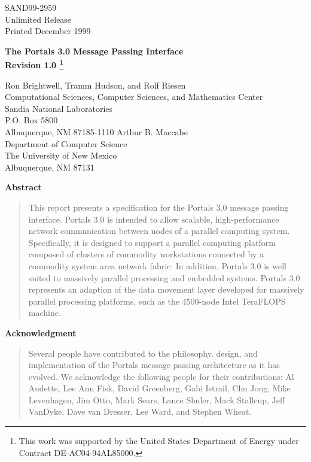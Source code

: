 \documentclass{sand-report}
\begin{document}
\setcounter{page}{3}

\begin{center}
SAND99-2959\\
Unlimited Release\\

\medskip
Printed December 1999

\vskip 1in

\renewcommand{\thefootnote}{\fnsymbol{footnote}}
{\large\bf The Portals 3.0 Message Passing Interface \\ Revision 1.0
\footnote[2]{This work was supported by the United States Department
of Energy under Contract DE-AC04-94AL85000.}
}
\renewcommand{\thefootnote}{\arabic{footnote}}


\vskip 0.5in

Ron Brightwell, Tramm Hudson, and Rolf Riesen\\
Computational Sciences, Computer Sciences, and Mathematics Center\\
Sandia National Laboratories\\
P.O. Box 5800\\
Albuquerque, NM 87185-1110
\vskip 0.25in
Arthur B. Maccabe\\
Department of Computer Science\\
The University of New Mexico\\
Albuquerque, NM 87131

\vskip 0.5in

{\large\bf Abstract}

\end{center}

\begin{quote}
  This report presents a specification for the Portals 3.0 message
  passing interface.  Portals 3.0 is intended to allow scalable,
  high-performance network communication between nodes of a parallel
  computing system.  Specifically, it is designed to support a
  parallel computing platform composed of clusters of commodity
  workstations connected by a commodity system area network fabric.
  In addition, Portals 3.0 is well suited to massively parallel
  processing and embedded systems.  Portals 3.0 represents an adaption
  of the data movement layer developed for massively parallel
  processing platforms, such as the 4500-node Intel TeraFLOPS machine.
\end{quote}

\newpage
 
\vskip 1.5in
\begin{center}
{\large\bf Acknowledgment}
\begin{quote}
  Several people have contributed to the philosophy, design, and
  implementation of the Portals message passing architecture as it has
  evolved.  We acknowledge the following people for their
  contributions: Al Audette, Lee Ann Fisk, David Greenberg, Gabi
  Istrail, Chu Jong, Mike Levenhagen, Jim Otto, Mark Sears, Lance
  Shuler, Mack Stallcup, Jeff VanDyke, Dave van Dresser, Lee Ward, and
  Stephen Wheat.
\end{quote}
\end{center}
 
\end{document}

